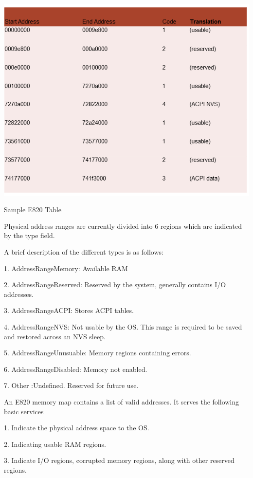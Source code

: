 \setlength{\belowcaptionskip}{-10pt}

\begin{table}[H]
  \centering
  \includegraphics[scale=0.6]{figures/e820table.png}
  \caption{Sample E820 Table}
  \label{fig:e820table}
\end{table}

Physical address ranges are currently divided into 6 regions which are indicated by the type field.

A brief description of the different types is as follows:

1. AddressRangeMemory: Available RAM

2. AddressRangeReserved: Reserved by the system, generally contains I/O addresses.

3. AddressRangeACPI: Stores ACPI tables.

4. AddressRangeNVS: Not usable by the OS. This range is required to be saved and restored across an NVS sleep.

5. AddressRangeUnusuable: Memory regions containing errors.

6. AddressRangeDisabled: Memory not enabled.

7. Other :Undefined. Reserved for future use.

An E820 memory map contains a list of valid addresses. It serves the following basic services

1. Indicate the physical address space to the OS.

2. Indicating usable RAM regions.

3. Indicate I/O regions, corrupted memory regions, along with other reserved regions.

